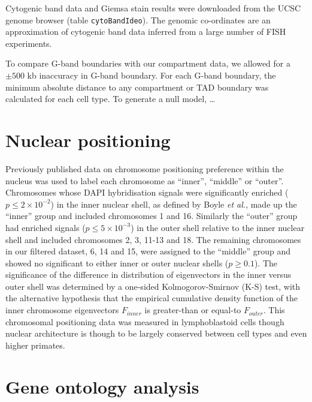 \documentclass[a4paper,10pt,oneside]{book}
\begin{document}
Cytogenic band data and Giemsa stain results were downloaded from the
UCSC genome browser (table \texttt{cytoBandIdeo}). The genomic
co-ordinates are an approximation of cytogenic band data inferred from a
large number of FISH experiments.\citep{Furey2003}

To compare G-band boundaries with our compartment data, we allowed for a
$\pm 500$ kb inaccuracy in G-band boundary. For each G-band boundary,
the minimum absolute distance to any compartment or TAD boundary was
calculated for each cell type. To generate a null model, \ldots

\section{Nuclear positioning}
Previously published data  on chromosome positioning preference within
the nucleus was used to label each chromosome as ``inner'', ``middle''
or ``outer''.\cite{Boyle2001} Chromosomes whose DAPI hybridisation
signals were significantly enriched ($p\leq 2\times10^{-2}$) in the inner nuclear shell, as
defined by Boyle \emph{et al.}\cite{Boyle2001}, made up the ``inner''
group and included chromosomes 1 and 16. Similarly the ``outer'' group
had enriched signals ($p\leq 5\times10^{-3}$) in the outer shell relative to the inner nuclear
shell and included chromosomes 2, 3, 11-13 and 18. The remaining
chromosomes in our filtered dataset, 6, 14 and 15, were assigned to
the ``middle'' group and showed no significant to either inner or
outer nuclear shells ($p \geq 0.1$).\cite{Boyle2001} The significance
of the difference in distribution of eigenvectors in the inner
versus outer shell was determined by a one-sided Kolmogorov-Smirnov (K-S)
test, with the alternative hypothesis that the empirical cumulative
density function of the inner chromosome eigenvectors $F_{inner}$
is greater-than or equal-to $F_{outer}$. This chromosomal positioning data was measured in lymphoblastoid
cells though nuclear architecture is though to be largely conserved
between cell types\cite{Chambers2013, DeWit2013} and even higher primates.\cite{Tanabe2002}

\section{Gene ontology analysis}

\ifstandalone
\begin{small}

\end{small}
\fi
\end{document}
